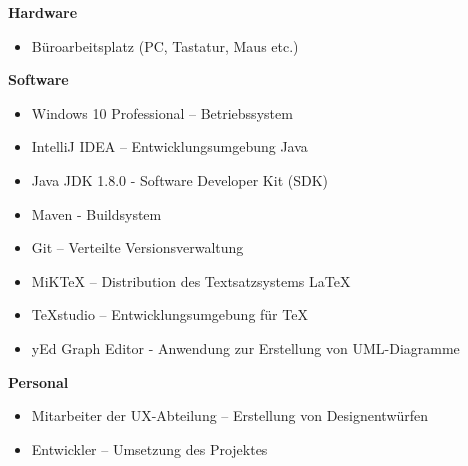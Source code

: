 \textbf{Hardware}

\begin{itemize}
\item Büroarbeitsplatz (PC, Tastatur, Maus etc.)
\end{itemize}
 
\textbf{Software}

\begin{itemize}
\item Windows 10 Professional – Betriebssystem
\item IntelliJ IDEA – Entwicklungsumgebung Java
\item Java JDK 1.8.0 - Software Developer Kit (SDK)
\item Maven - Buildsystem
\item Git – Verteilte Versionsverwaltung
\item MiKTeX – Distribution des Textsatzsystems \LaTeX
\item TeXstudio – Entwicklungsumgebung für \TeX
\item yEd Graph Editor - Anwendung zur Erstellung von UML-Diagramme
\end{itemize}

\textbf{Personal}

\begin{itemize}
\item Mitarbeiter der UX-Abteilung – Erstellung von Designentwürfen
\item Entwickler – Umsetzung des Projektes
\end{itemize}

\vfill